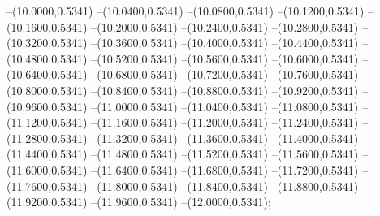 {	--(10.0000,0.5341)
	--(10.0400,0.5341)
	--(10.0800,0.5341)
	--(10.1200,0.5341)
	--(10.1600,0.5341)
	--(10.2000,0.5341)
	--(10.2400,0.5341)
	--(10.2800,0.5341)
	--(10.3200,0.5341)
	--(10.3600,0.5341)
	--(10.4000,0.5341)
	--(10.4400,0.5341)
	--(10.4800,0.5341)
	--(10.5200,0.5341)
	--(10.5600,0.5341)
	--(10.6000,0.5341)
	--(10.6400,0.5341)
	--(10.6800,0.5341)
	--(10.7200,0.5341)
	--(10.7600,0.5341)
	--(10.8000,0.5341)
	--(10.8400,0.5341)
	--(10.8800,0.5341)
	--(10.9200,0.5341)
	--(10.9600,0.5341)
	--(11.0000,0.5341)
	--(11.0400,0.5341)
	--(11.0800,0.5341)
	--(11.1200,0.5341)
	--(11.1600,0.5341)
	--(11.2000,0.5341)
	--(11.2400,0.5341)
	--(11.2800,0.5341)
	--(11.3200,0.5341)
	--(11.3600,0.5341)
	--(11.4000,0.5341)
	--(11.4400,0.5341)
	--(11.4800,0.5341)
	--(11.5200,0.5341)
	--(11.5600,0.5341)
	--(11.6000,0.5341)
	--(11.6400,0.5341)
	--(11.6800,0.5341)
	--(11.7200,0.5341)
	--(11.7600,0.5341)
	--(11.8000,0.5341)
	--(11.8400,0.5341)
	--(11.8800,0.5341)
	--(11.9200,0.5341)
	--(11.9600,0.5341)
	--(12.0000,0.5341);
}
